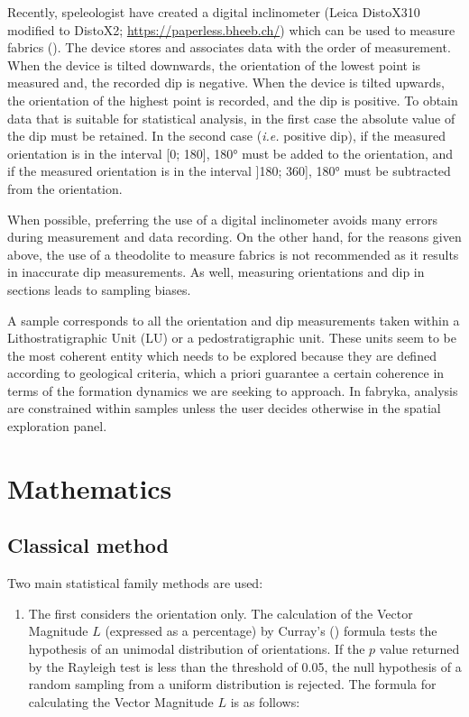 \documentclass[
]{article}
\providecommand{\tightlist}{%
  \setlength{\itemsep}{0pt}\setlength{\parskip}{0pt}}
\begin{document}
Recently, speleologist have created a digital inclinometer (Leica
DistoX310 modified to DistoX2; \url{https://paperless.bheeb.ch/}) which
can be used to measure fabrics (). The device stores and associates data with the order of
measurement. When the device is tilted downwards, the orientation of the
lowest point is measured and, the recorded dip is negative. When the
device is tilted upwards, the orientation of the highest point is
recorded, and the dip is positive. To obtain data that is suitable for
statistical analysis, in the first case the absolute value of the dip
must be retained. In the second case (\emph{i.e.} positive dip), if the
measured orientation is in the interval {[}0; 180{]}, 180° must be added
to the orientation, and if the measured orientation is in the interval
{]}180; 360{]}, 180° must be subtracted from the orientation.

When possible, preferring the use of a digital inclinometer avoids many
errors during measurement and data recording. On the other hand, for the
reasons given above, the use of a theodolite to measure fabrics is not
recommended as it results in inaccurate dip measurements. As well,
measuring orientations and dip in sections leads to sampling biases.

A sample corresponds to all the orientation and dip measurements taken
within a Lithostratigraphic Unit (LU) or a pedostratigraphic unit. These
units seem to be the most coherent entity which needs to be explored
because they are defined according to geological criteria, which a
priori guarantee a certain coherence in terms of the formation dynamics
we are seeking to approach. In fabryka, analysis are constrained within
samples unless the user decides otherwise in the spatial exploration
panel. \bigbreak

\section{Mathematics}\label{mathematics}

\subsection{Classical method}\label{classical-method}

Two main statistical family methods are used:

\begin{enumerate}
\def\labelenumi{\arabic{enumi}.}
\tightlist
\item
  The first considers the orientation only. The calculation of the
  Vector Magnitude \(L\) (expressed as a percentage) by Curray's
  () formula tests the hypothesis of an
  unimodal distribution of orientations. If the \(p\) value returned by
  the Rayleigh test is less than the threshold of 0.05, the null
  hypothesis of a random sampling from a uniform distribution is
  rejected. The formula for calculating the Vector Magnitude \(L\) is as
  follows:
\end{enumerate}
\end{document}
